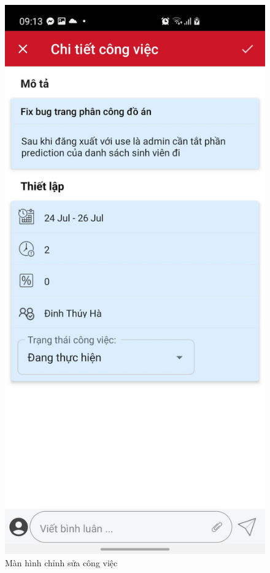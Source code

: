 \documentclass[../Main.tex]{subfiles}
\begin{document}
\begin{figure}[H]
\begin{minipage}{0.5\textwidth}
\includegraphics[width=0.7\linewidth]{Figure/screen/edit_task.jpeg}
\caption{Màn hình chỉnh sửa công việc} \label{fig:list_task}
\end{minipage}
\end{figure}
\noindent %
\end{document}
